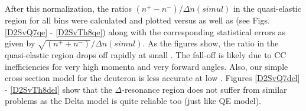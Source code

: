After this normalization, the ratios $(n^+ - n^-)/\Delta n(simul)$ in the quasi-elastic region for all \qsqs %
bins were calculated and plotted versus \qsqs as well as \ths %
(see Figs. \ref{D2SvQ7qe} - \ref{D2SvTh8qe})
along with the corresponding statistical errors as given by $\sqrt{(n^+ + n^-)}/\Delta n(simul)$. As the figures show, the ratio in the quasi-elastic region drops %
off rapidly at small \qsq. The fall-off is likely due to CC inefficiencies for very high momenta and very forward angles. Also, our simple cross section model for the deuteron is less accurate at low \qsq.  Figures \ref{D2SvQ7del} - \ref{D2SvTh8del} show that the $\Delta$-resonance region does not suffer from similar problems %
as the Delta model is quite reliable too (just like QE model).

